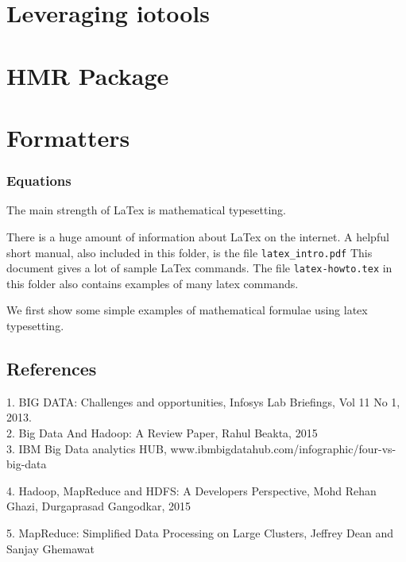 \documentclass[11pt]{book}
\begin{document}
\chapter{Leveraging iotools}



\chapter{HMR Package}



\chapter{Formatters}







\subsection{Equations}
The main strength of LaTex is  mathematical typesetting.  

There is a huge amount of information about LaTex on the internet.
A helpful short manual, also included in this folder, is the file
\verb+latex_intro.pdf+
This document gives a lot of sample LaTex commands.  
The file \verb+latex-howto.tex+ in this folder also contains examples of many latex commands.




We first show  some simple examples of 
mathematical formulae using latex typesetting.





\section{References}
1. BIG DATA: Challenges and opportunities, Infosys Lab Briefings,
Vol 11 No 1, 2013. \\

2. Big Data And Hadoop: A Review Paper, Rahul Beakta, 2015 \\

 3. IBM Big Data analytics HUB,
www.ibmbigdatahub.com/infographic/four-vs-big-data

4. Hadoop, MapReduce and HDFS: A Developers Perspective, 
Mohd Rehan Ghazi, Durgaprasad Gangodkar, 2015

5. MapReduce: Simplified Data Processing on Large Clusters, 
Jeffrey Dean and Sanjay Ghemawat
\end{document}
